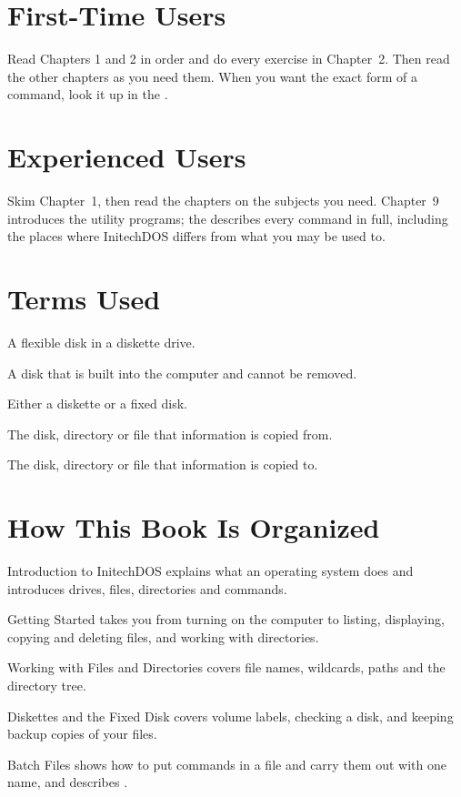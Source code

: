 \section{First-Time Users}
Read Chapters 1 and 2 in order and do every exercise in Chapter~2.  Then
read the other chapters as you need them.  When you want the exact form of a
command, look it up in the .

\section{Experienced Users}
Skim Chapter~1, then read the chapters on the subjects you need.  Chapter~9
introduces the utility programs; the 
describes every command in full, including the places where InitechDOS
differs from what you may be used to.

\section{Terms Used}
A flexible disk in a diskette drive.

A disk that is built into the computer and cannot be
removed.

Either a diskette or a fixed disk.

The disk, directory or file that information is copied
from.

The disk, directory or file that information is copied
to.

\section{How This Book Is Organized}
Introduction to InitechDOS explains what an operating
system does and introduces drives, files, directories and commands.

Getting Started takes you from turning on the computer
to listing, displaying, copying and deleting files, and working with
directories.

Working with Files and Directories covers file names,
wildcards, paths and the directory tree.

Diskettes and the Fixed Disk covers volume labels,
checking a disk, and keeping backup copies of your files.

Batch Files shows how to put commands in a file and
carry them out with one name, and describes .

